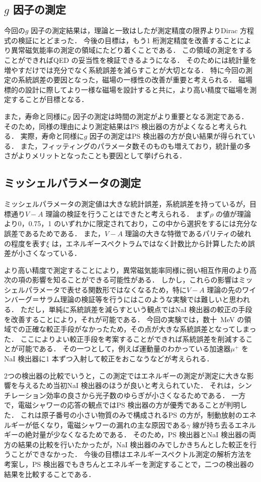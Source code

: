 \subsection{$g$ 因子の測定}
今回の$g$ 因子の測定結果は，理論と一致はしたが測定精度の限界よりDirac 方程式の検証にとどまった．
今後の目標は，もう1 桁測定精度を改善することにより異常磁気能率の測定の領域にたどり着くことである．
この領域の測定をすることができればQED の妥当性を検証できるようになる．
そのためには統計量を増やすだけでは充分でなく系統誤差を減らすことが大切となる．
特に今回の測定の系統誤差の要因となった，磁場の一様性の改善が重要と考えられる．
磁場標的の設計に際してより一様な磁場を設計すると共に，より高い精度で磁場を測定することが目標となる．

また，寿命と同様に$g$ 因子の測定は時間の測定がより重要となる測定である．
そのため，同様の理由により測定結果はPS 検出器の方がよくなると考えられる．
実際，寿命と同様に$g$ 因子の測定はPS 検出器の方が良い結果が得られている．
また，フィッティングのパラメータ数そのものも増えており，統計量の多さがよりメリットとなったことも要因として挙げられる．

\subsection{ミッシェルパラメータの測定}
ミッシェルパラメータの測定値は大きな統計誤差，系統誤差を持っているが，目標通り$V-A$ 理論の検証を行うことはできたと考えられる．
まず$\rho$ の値が理論より0，0.75，1 のいずれかに限定されており，この中から選択をするには充分な誤差であるためである．
また，$V-A$ 理論の大きな特徴であるパリティの破れの程度を表す$\xi$ は，エネルギースペクトラムではなく計数比から計算したため誤差が小さくなっている．

より高い精度で測定することにより，異常磁気能率同様に弱い相互作用のより高次の項の影響を知ることができる可能性がある．
しかし，これらの影響はミッシェルパラメータで表せる関数形ではなくなるため，特に$V-A$ 理論の先のワインバーグ＝サラム理論の検証等を行うにはこのような実験では難しいと思われる．
ただし，単純に系統誤差を減らすという観点ではNaI 検出器の較正の手段を改善することにより，それが可能である．
今回の実験では，数十~MeV の領域での正確な較正手段がなかったため，その点が大きな系統誤差となってしまった．
ここによりよい較正手段を考案することができれば系統誤差を削減することが可能である．
その一つとして，例えば運動量のわかっている加速器$\mu^{+}$ をNaI 検出器に1 本ずつ入射して較正をおこなうなどが考えられる．

2つの検出器の比較でいうと，この測定ではエネルギーの測定が測定に大きな影響を与えるため当初NaI 検出器のほうが良いと考えられていた．
それは，シンチレーション効率の良さから光子数のゆらぎが小さくなるためである．
一方で，電磁シャワーの応答の観点ではPS 検出器の方が優秀であることが判明した．
これは原子番号の小さい物質のみで構成されるPS の方が，制動放射のエネルギーが低くなり，電磁シャワーの漏れの主な原因である$\gamma$ 線が持ち去るエネルギーの絶対量が少なくなるためである．
そのため，PS 検出器とNaI 検出器の両方の結果の比較を行いたかったが，NaI 検出器のみでしかきちんとした較正を行うことができなかった．
今後の目標はエネルギースペクトル測定の解析方法を考案し，PS 検出器でもきちんとエネルギーを測定することで，二つの検出器の結果を比較することである．

